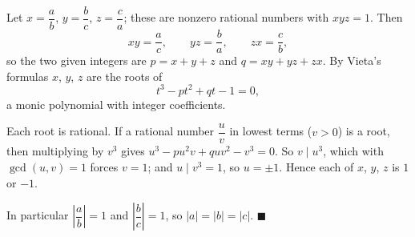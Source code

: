 Let $x=\dfrac{a}{b}$, $y=\dfrac{b}{c}$, $z=\dfrac{c}{a}$; these are nonzero rational numbers with $xyz=1$. Then
\[
xy=\dfrac{a}{c},\qquad yz=\dfrac{b}{a},\qquad zx=\dfrac{c}{b},
\]
so the two given integers are $p=x+y+z$ and $q=xy+yz+zx$. By Vieta's formulas $x$, $y$, $z$ are the roots of
\[
t^3-pt^2+qt-1=0,
\]
a monic polynomial with integer coefficients.

Each root is rational. If a rational number $\dfrac{u}{v}$ in lowest terms ($v>0$) is a root, then multiplying by $v^3$ gives $u^3-pu^2v+quv^2-v^3=0$. So $v\mid u^3$, which with $\gcd(u,v)=1$ forces $v=1$; and $u\mid v^3=1$, so $u=\pm1$. Hence each of $x$, $y$, $z$ is $1$ or $-1$.

In particular $\left|\dfrac{a}{b}\right|=1$ and $\left|\dfrac{b}{c}\right|=1$, so $|a|=|b|=|c|$. $\blacksquare$
